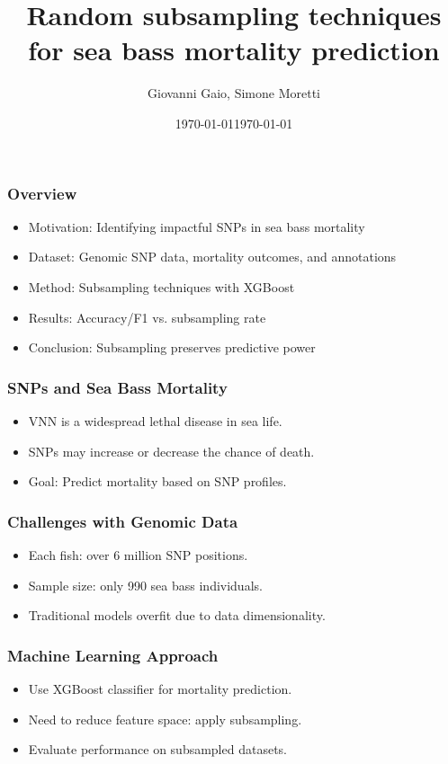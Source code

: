 \documentclass[aspectratio=169]{beamer}
\title{Random subsampling techniques for sea bass mortality prediction}
\author{Giovanni Gaio, Simone Moretti}
\date{\today}
\subtitle{}
\date{\today}
\begin{document}
\frame{\titlepage}

\begin{frame}
\frametitle{Overview}
\begin{itemize}
  \item Motivation: Identifying impactful SNPs in sea bass mortality
  \item Dataset: Genomic SNP data, mortality outcomes, and annotations
  \item Method: Subsampling techniques with XGBoost
  \item Results: Accuracy/F1 vs. subsampling rate
  \item Conclusion: Subsampling preserves predictive power
\end{itemize}
\end{frame}

\begin{frame}
\frametitle{SNPs and Sea Bass Mortality}
\begin{itemize}
  \item VNN is a widespread lethal disease in sea life.
  \item SNPs may increase or decrease the chance of death.
  \item Goal: Predict mortality based on SNP profiles.
\end{itemize}
\end{frame}

\begin{frame}
\frametitle{Challenges with Genomic Data}
\begin{itemize}
  \item Each fish: over 6 million SNP positions.
  \item Sample size: only 990 sea bass individuals.
  \item Traditional models overfit due to data dimensionality.
\end{itemize}
\end{frame}

\begin{frame}
\frametitle{Machine Learning Approach}
\begin{itemize}
  \item Use XGBoost classifier for mortality prediction.
  \item Need to reduce feature space: apply subsampling.
  \item Evaluate performance on subsampled datasets.
\end{itemize}
\end{frame}
\end{document}
